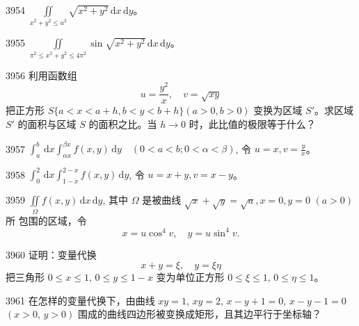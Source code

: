 \begin{prob}[S]{3954}
$\iint\limits_{x^2 + y^2 \leqslant a^2} \sqrt{x^2 + y^2}\,\mathrm{d}x\,\mathrm{d}y$。
\end{prob}

\begin{prob}[S]{3955}
$\iint\limits_{\pi^2 \leqslant x^2 + y^2 \leqslant 4\pi^2} \sin\sqrt{x^2 + y^2}\,\mathrm{d}x\,\mathrm{d}y$。
\end{prob}

\begin{prob}[M]{3956}
利用函数组
\[
u = \frac{y^2}{x}, \quad v = \sqrt{xy}
\]
把正方形 $S\{a < x < a + h, b < y < b + h\} (a > 0, b > 0)$ 变换为区域 $S'$。求区域 $S'$ 的面积与区域 $S$ 的面积之比。当 $h \to 0$ 时，此比值的极限等于什么？
\end{prob}


\begin{prob}[S]{3957}
$\int_{a}^{b}\,\mathrm{d}x \int_{\alpha x}^{\beta x} f(x, y)\,\mathrm{d}y \quad (0 < a < b; 0 < \alpha < \beta)$, 令 $u = x, v = \frac{y}{x}$。
\end{prob}

\begin{prob}[S]{3958}
$\int_{0}^{2}\,\mathrm{d}x \int_{1 - x}^{2 - x} f(x, y)\,\mathrm{d}y$, 令 $u = x + y, v = x - y$。
\end{prob}

\begin{prob}[M]{3959}
$\iint\limits_{\Omega} f(x, y)\,\mathrm{d}x\,\mathrm{d}y$, 其中 $\Omega$ 是被曲线 $\sqrt{x} + \sqrt{y} = \sqrt{a}, x = 0, y = 0$ $(a > 0)$ 所
包围的区域，令
\[
x = u \cos^4 v, \quad y = u \sin^4 v.
\]
\end{prob}

\begin{prob}[M]{3960}
证明：变量代换
\[
x + y = \xi, \quad y = \xi\eta
\]
把三角形 $0 \leqslant x \leqslant 1, \, 0 \leqslant y \leqslant 1 - x$ 变为单位正方形 $0 \leqslant \xi \leqslant 1, \, 0 \leqslant \eta \leqslant 1$。
\end{prob}

\begin{prob}[M]{3961}
在怎样的变量代换下，由曲线 $xy = 1, \, xy = 2, \, x - y + 1 = 0, \, x - y - 1 = 0$ $(x > 0, \, y > 0)$ 围成的曲线四边形被变换成矩形，且其边平行于坐标轴？
\end{prob}


